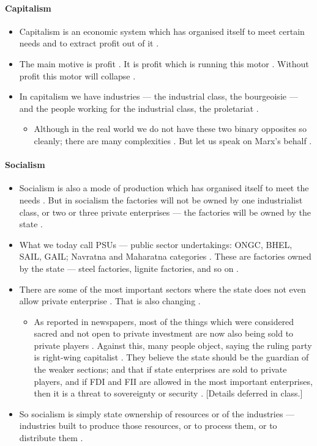 \paragraph{Capitalism}
\begin{itemize}
    \item Capitalism is an economic system which has organised itself to meet certain needs and to extract profit out of it .
    \item The main motive is profit . It is profit which is running this motor . Without profit this motor will collapse .
    \item In capitalism we have industries --- the industrial class, the bourgeoisie --- and the people working for the industrial class, the proletariat .
    \begin{itemize}
        \item Although in the real world we do not have these two binary opposites so cleanly; there are many complexities . But let us speak on Marx's behalf .
    \end{itemize}
\end{itemize}

\paragraph{Socialism}
\begin{itemize}
    \item Socialism is also a mode of production which has organised itself to meet the needs . But in socialism the factories will not be owned by one industrialist class, or two or three private enterprises --- the factories will be owned by the state .
    \item What we today call PSUs --- public sector undertakings: ONGC, BHEL, SAIL, GAIL; Navratna and Maharatna categories . These are factories owned by the state --- steel factories, lignite factories, and so on .
    \item There are some of the most important sectors where the state does not even allow private enterprise . That is also changing .
    \begin{itemize}
        \item As reported in newspapers, most of the things which were considered sacred and not open to private investment are now also being sold to private players . Against this, many people object, saying the ruling party is right-wing capitalist . They believe the state should be the guardian of the weaker sections; and that if state enterprises are sold to private players, and if FDI and FII are allowed in the most important enterprises, then it is a threat to sovereignty or security . [Details deferred in class.] 
    \end{itemize}
    \item So socialism is simply state ownership of resources or of the industries --- industries built to produce those resources, or to process them, or to distribute them .
\end{itemize}

